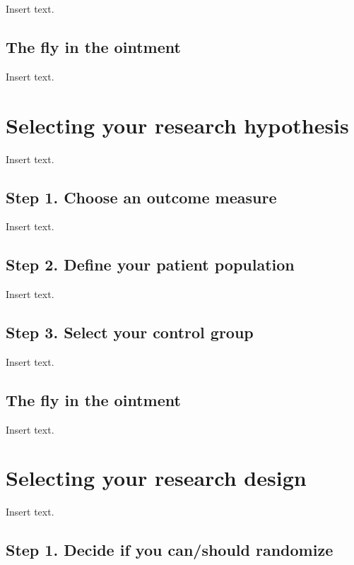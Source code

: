 \documentclass[
  letterpaper,
  DIV=11,
  numbers=noendperiod]{scrreprt}
\begin{document}
Insert text.

\section{The fly in the ointment}\label{the-fly-in-the-ointment}

Insert text.


\chapter{Selecting your research
hypothesis}\label{selecting-your-research-hypothesis}

Insert text.

\section{Step 1. Choose an outcome
measure}\label{step-1.-choose-an-outcome-measure}

Insert text.

\section{Step 2. Define your patient
population}\label{step-2.-define-your-patient-population}

Insert text.

\section{Step 3. Select your control
group}\label{step-3.-select-your-control-group}

Insert text.

\section{The fly in the ointment}\label{the-fly-in-the-ointment-1}

Insert text.


\chapter{Selecting your research
design}\label{selecting-your-research-design}

Insert text.

\section{Step 1. Decide if you can/should
randomize}\label{step-1.-decide-if-you-canshould-randomize}
\end{document}
